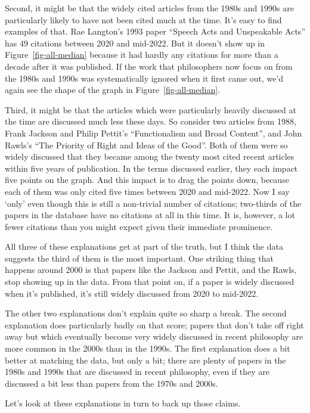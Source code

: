 \documentclass[
  10pt,
  letterpaper,
  DIV=11,
  numbers=noendperiod,
  twoside]{scrartcl}
\begin{document}
Second, it might be that the widely cited articles from the 1980s and
1990s are particularly likely to have not been cited much at the time.
It's easy to find examples of that. Rae Langton's 1993 paper ``Speech
Acts and Unspeakable Acts'' has 49 citations between 2020 and mid-2022.
But it doesn't show up in Figure~\ref{fig-all-median} because it had
hardly any citations for more than a decade after it was published. If
the work that philosophers now focus on from the 1980s and 1990s was
systematically ignored when it first came out, we'd again see the shape
of the graph in Figure~\ref{fig-all-median}.

Third, it might be that the articles which were particularly heavily
discussed at the time are discussed much less these days. So consider
two articles from 1988, Frank Jackson and Philip Pettit's
``Functionalism and Broad Content'', and John Rawls's ``The Priority of
Right and Ideas of the Good''. Both of them were so widely discussed
that they became among the twenty most cited recent articles within five
years of publication. In the terms discussed earlier, they each impact
five points on the graph. And this impact is to drag the points down,
because each of them was only cited five times between 2020 and
mid-2022. Now I say `only' even though this is still a non-trivial
number of citations; two-thirds of the papers in the database have no
citations at all in this time. It is, however, a lot fewer citations
than you might expect given their immediate prominence.

All three of these explanations get at part of the truth, but I think
the data suggests the third of them is the most important. One striking
thing that happens around 2000 is that papers like the Jackson and
Pettit, and the Rawls, stop showing up in the data. From that point on,
if a paper is widely discussed when it's published, it's still widely
discussed from 2020 to mid-2022.

The other two explanations don't explain quite so sharp a break. The
second explanation does particularly badly on that score; papers that
don't take off right away but which eventually become very widely
discussed in recent philosophy are more common in the 2000s than in the
1990s. The first explanation does a bit better at matching the data, but
only a bit; there are plenty of papers in the 1980s and 1990s that are
discussed in recent philosophy, even if they are discussed a bit less
than papers from the 1970s and 2000s.

Let's look at these explanations in turn to back up those claims.
\end{document}
